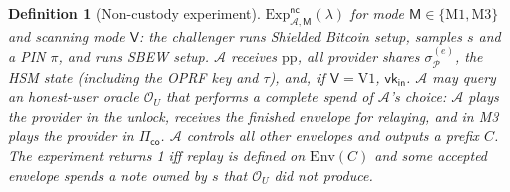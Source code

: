 \documentclass[11pt]{article}
\newtheorem{definition}{Definition}
\theoremstyle{remark}
\newcommand{\vk}{\mathsf{vk}}
\newcommand{\SB}{Shielded Bitcoin}
\newcommand{\sysname}{\textsf{SBEW}}
\begin{document}
\begin{definition}[Non-custody experiment]
$\mathrm{Exp}^{\mathsf{nc}}_{\mathcal{A},\mathsf{M}}(\lambda)$ for mode $\mathsf{M} \in \{\mathrm{M1},\mathrm{M3}\}$ and scanning mode $\mathsf{V}$: the challenger runs \SB{} setup, samples $s$ and a PIN $\pi$, and runs \sysname{} setup. $\mathcal{A}$ receives $\mathrm{pp}$, all provider shares $\sigma_{\mathcal{P}}^{(e)}$, the HSM state (including the OPRF key and $\tau$), and, if $\mathsf{V}=\mathrm{V1}$, $\vk_{\mathsf{in}}$. $\mathcal{A}$ may query an honest-user oracle $\mathcal{O}_U$ that performs a complete spend of $\mathcal{A}$'s choice: $\mathcal{A}$ plays the provider in the unlock, receives the finished envelope for relaying, and in M3 plays the provider in $\Pi_{\mathsf{co}}$. $\mathcal{A}$ controls all other envelopes and outputs a prefix $C$. The experiment returns 1 iff replay is defined on $\mathrm{Env}(C)$ and some accepted envelope spends a note owned by $s$ that $\mathcal{O}_U$ did not produce.
\end{definition}
\end{document}
